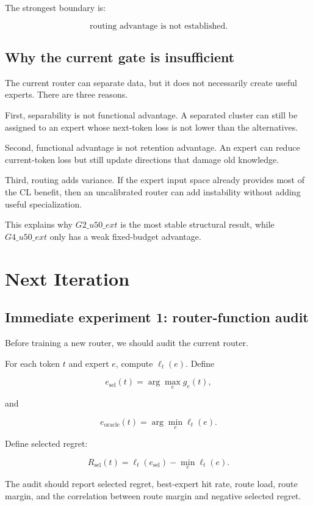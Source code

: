 \documentclass[11pt]{article}
\begin{document}
The strongest boundary is:

$$
\text{routing advantage is not established.}
$$

\subsection{Why the current gate is insufficient}

The current router can separate data, but it does not necessarily create useful experts. There are three reasons.

First, separability is not functional advantage. A separated cluster can still be assigned to an expert whose next-token loss is not lower than the alternatives.

Second, functional advantage is not retention advantage. An expert can reduce current-token loss but still update directions that damage old knowledge.

Third, routing adds variance. If the expert input space already provides most of the CL benefit, then an uncalibrated router can add instability without adding useful specialization.

This explains why $G2\_u50\_ext$ is the most stable structural result, while $G4\_u50\_ext$ only has a weak fixed-budget advantage.

\section{Next Iteration}

\subsection{Immediate experiment 1: router-function audit}

Before training a new router, we should audit the current router.

For each token $t$ and expert $e$, compute $\ell_t(e)$. Define

$$
e_{\mathrm{sel}}(t)=\arg\max_e g_e(t),
$$

and

$$
e_{\mathrm{oracle}}(t)=\arg\min_e \ell_t(e).
$$

Define selected regret:

$$
R_{\mathrm{sel}}(t)=\ell_t(e_{\mathrm{sel}})-\min_e\ell_t(e).
$$

The audit should report selected regret, best-expert hit rate, route load, route margin, and the correlation between route margin and negative selected regret.
\end{document}
